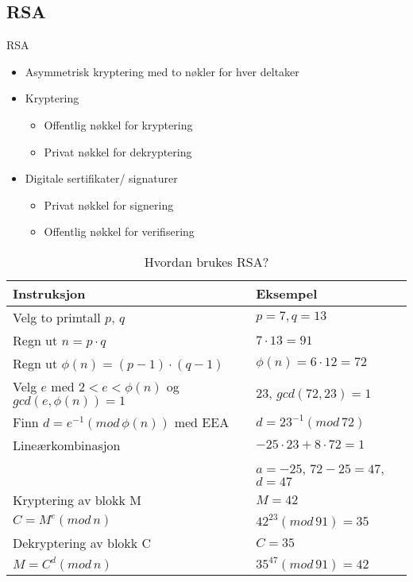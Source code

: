 \subsection*{RSA}
\begin{frame}{RSA}
\begin{itemize}
\item Asymmetrisk kryptering med to nøkler for hver deltaker
\item Kryptering
	\begin{itemize}
	\item Offentlig nøkkel for kryptering
	\item Privat nøkkel for dekryptering
	\end{itemize}
\item Digitale sertifikater/ signaturer
	\begin{itemize}
	\item Privat nøkkel for signering
	\item Offentlig nøkkel for verifisering
	\end{itemize}
\end{itemize}
\end{frame}


\begin{frame}{}
\begin{table}
\begin{tabular}{l|l}
Instruksjon & Eksempel\\ \hline
Velg to primtall $p$, $q$ & $p=7, q=13$\\
Regn ut $n=p\cdot q$ & $7\cdot 13=91$\\
Regn ut $\phi(n)=(p-1)\cdot(q-1)$&$\phi(n)=6\cdot12=72$\\
Velg $e$ med $2<e<\phi(n)$ og $gcd(e,\phi(n))=1$&23, $gcd(72,23)=1$\\
Finn $d=e^{-1} (mod\, \phi(n))$ med EEA & $d=23^{-1} (mod\, 72)$\\
\indent\hspace{3mm} Lineærkombinasjon & $-25\cdot 23+8\cdot 72=1$\\
& $a=-25$, $72-25=47$, $d=47$\\
Kryptering av blokk M & $M=42$\\
\indent\hspace{3mm} $C=M^e(mod\, n)$&$42^{23} (mod\, 91)=35$\\
Dekryptering av blokk C & $C=35$\\
\indent\hspace{3mm} $M=C^d(mod\, n)$&$35^{47} (mod\, 91)=42$
\end{tabular}
\caption{Hvordan brukes RSA?}
\end{table}
\end{frame}

